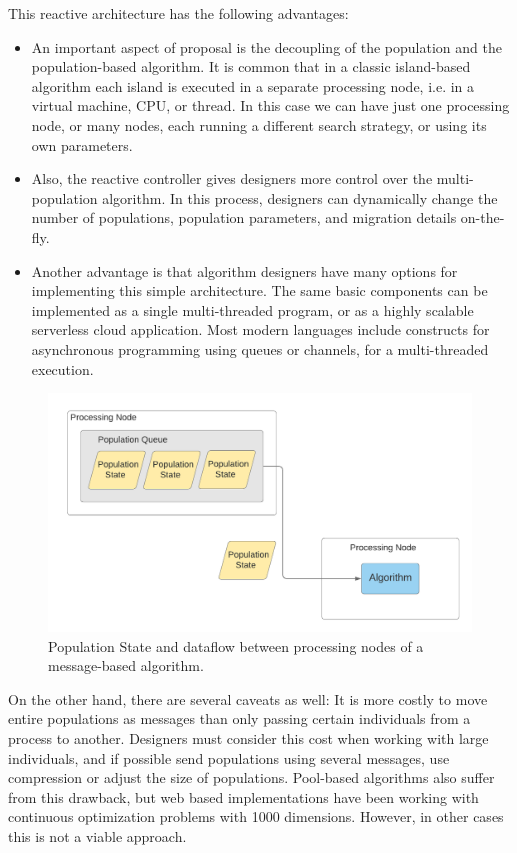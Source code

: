 \documentclass[review]{elsarticle}
\begin{document}
This reactive architecture has the following advantages:\begin{itemize}
\item 
An important aspect of proposal is the decoupling of the population and 
the population-based algorithm. It is common that in a classic island-based algorithm
each island is executed in a separate processing node, i.e. in a virtual machine, CPU,
or thread. In this case we can have just one processing node, or many nodes, each 
running a different search strategy, or using its own parameters. 
\item 
Also, the reactive controller gives designers more control over the multi-population algorithm.
In this process, designers can dynamically change the number of populations, population parameters,
and migration details on-the-fly.
\item 
Another advantage is that algorithm designers have many options for implementing this simple architecture. 
The same basic components can be implemented as a single multi-threaded program, or 
as a highly scalable serverless cloud application. Most modern languages include 
constructs for asynchronous programming using queues or channels, for a multi-threaded
execution.
\end{itemize}

\begin{figure}[ht]
    \centering
    \includegraphics[width=\textwidth]{population_message}
    \caption{Population State and dataflow between processing nodes of a message-based algorithm.}
    \label{fig:population_message}
\end{figure}

On the other hand, there are several caveats as well: It is more
costly to move entire populations as messages than only passing
certain individuals from a process to another. Designers must consider
this cost when working with large individuals, and if possible send
populations using several messages, use compression or adjust the size
of populations. Pool-based algorithms also suffer from this drawback,
but web based implementations have been working with continuous
optimization problems with 1000 dimensions.  However, in other cases
this is not a viable approach.
\end{document}
